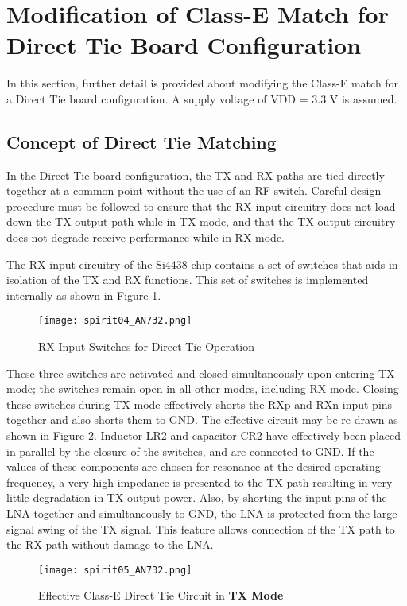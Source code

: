   \section{Modification of Class-E Match for Direct Tie Board Configuration}
    In this section, further detail is provided about modifying the Class-E match for a Direct Tie board 
    configuration. A supply voltage of VDD = 3.3 V is assumed.
    
    \subsection{Concept of Direct Tie Matching}
      In the Direct Tie board configuration, the TX and RX paths are tied directly together at a common 
      point without the use of an RF switch. Careful design procedure must be followed to ensure that the 
      RX input circuitry does not load down the TX output path while in TX mode, and that the TX output 
      circuitry does not degrade receive performance while in RX mode.
      
      The RX input circuitry of the Si4438 chip contains a set of switches that aids in isolation of the 
      TX and RX functions. This set of switches is implemented internally as shown in Figure 
      \ref{EXP001:fig_spirit04}.
    
      \begin{figure}[ht!]  %
        \centering
        \texttt{[image: spirit04\_AN732.png]}
        \caption{RX Input Switches for Direct Tie Operation}
        \label{EXP001:fig_spirit04}
      \end{figure}
      
      These three switches are activated and closed simultaneously upon entering TX mode; the switches 
      remain open in all other modes, including RX mode. Closing these switches during TX mode 
      effectively shorts the RXp and RXn input pins together and also shorts them to GND. The effective 
      circuit may be re-drawn as shown in Figure \ref{EXP001:fig_spirit05}. Inductor LR2 and capacitor 
      CR2 have effectively been placed in parallel by the closure of the switches, and are connected to 
      GND. If the values of these components are chosen for resonance at the desired operating frequency, 
      a very high impedance is presented to the TX path resulting in very little degradation in TX output 
      power. Also, by shorting the input pins of the LNA together and simultaneously to GND, the LNA is 
      protected from the large signal swing of the TX signal. This feature allows connection of the TX 
      path to the RX path without damage to the LNA.
      \begin{figure}[ht!]  %
        \centering
        \texttt{[image: spirit05\_AN732.png]}
        \caption{Effective Class-E Direct Tie Circuit in \textbf{TX Mode}}
        \label{EXP001:fig_spirit05}
      \end{figure}
      
